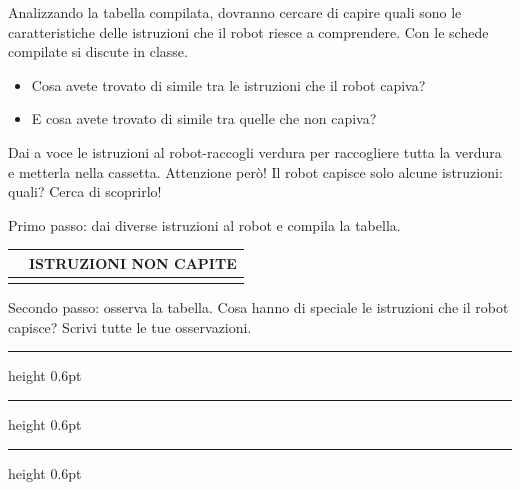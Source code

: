 Analizzando la tabella compilata, dovranno cercare di capire quali sono le caratteristiche delle istruzioni che il robot riesce a comprendere. Con le schede compilate si discute in classe.

\begin{domandestimolo}\label{domande-stimolo-3}

\begin{itemize}
\item
  Cosa avete trovato di simile tra le istruzioni che il robot capiva?
\item
  E cosa avete trovato di simile tra quelle che non capiva?
\end{itemize}
\end{domandestimolo}

\begin{scheda}[A][4]
\label{scheda-studenti-fase-0}
Dai a voce le istruzioni al robot-raccogli verdura per raccogliere tutta la verdura e metterla nella cassetta. Attenzione però! Il robot capisce solo alcune istruzioni: quali? Cerca di scoprirlo!\par
\vspace{5mm}
Primo passo: dai diverse istruzioni al robot e compila la tabella.\par
\vspace{4mm}
\begingroup
\setlength{\tabcolsep}{3mm}
\setlength{\arrayrulewidth}{0.6pt}
\renewcommand{\arraystretch}{1}
\noindent\begin{tabular}{|p{}|p{}|}
\hline
\rowcolor{black!10}
\multicolumn{1}{|c|}{\rule[-3mm]{0pt}{12mm}\fontsize{16}{20}\selectfont\textbf{ISTRUZIONI CAPITE}} &
\multicolumn{1}{c|}{\fontsize{16}{20}\selectfont\textbf{ISTRUZIONI NON CAPITE}} \\
\hline
\rule{0pt}{84mm} & \\\hline
\end{tabular}\par
\endgroup
\vspace{6mm}
Secondo passo: osserva la tabella. Cosa hanno di speciale le istruzioni che il robot capisce? Scrivi tutte le tue osservazioni.\par
{\color{black!55}%
\vspace{9mm}\hrule height 0.6pt
\vspace{9mm}\hrule height 0.6pt
\vspace{9mm}\hrule height 0.6pt}
\end{scheda}

